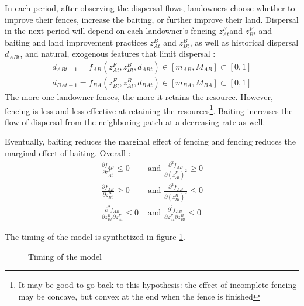 \documentclass{article}
\begin{document}
In each period, after observing the dispersal flows, landowners choose whether to improve their fences, increase the baiting, or further improve their land. 
Dispersal in the next period will depend on each landowner's fencing $z_{At}^F$and $z_{Bt}^F$ and baiting and land improvement practices $z_{At}^B$ and $z_{Bt}^B$, as well as historical dispersal $d_{ABt}$, and natural, exogenous features that limit dispersal : 
\begin{align}
    d_{ABt+1} = f_{AB}(z^F_{At}, z^B_{Bt}, d_{ABt}) \in [m_{AB},M_{AB}] \subset [0,1] \\
    d_{BAt+1} = f_{BA}(z^F_{Bt}, z^B_{At}, d_{BAt}) \in [m_{BA},M_{BA}] \subset [0,1]
\end{align}
The more one landowner fences, the more it retains the resource. However, fencing is less and less effective at retaining the resources\footnote{It may be good to go back to this hypothesis: the effect of incomplete fencing may be concave, but convex at the end when the fence is finished}. Baiting increases the flow of dispersal from the neighboring patch at a decreasing rate as well. 

Eventually, baiting reduces the marginal effect of fencing and fencing reduces the marginal effect of baiting. Overall : 
\begin{align*}
    \frac{\partial f_{AB}}{\partial z^F_{At}}\leq 0 &\text{ and } \frac{\partial^2 f_{AB}}{\partial (z^F_{At})^2} \geq 0\\
    \frac{\partial f_{AB}}{\partial z^B_{Bt}}\geq 0 &\text{ and } \frac{\partial^2 f_{AB}}{\partial (z^B_{Bt})^2} \leq 0\\
    \frac{\partial ^2 f_{AB}}{\partial z_{Bt}^B\partial z_{At}^F} \leq 0 &\text{ and } \frac{\partial ^2 f_{AB}}{\partial z_{At}^F\partial z_{Bt}^B} \leq 0
\end{align*}

The timing of the model is synthetized in figure \ref{fig:timing}.

\begin{figure}[H]
  \centering
  \caption{Timing of the model}
  \label{fig:timing}
\end{figure}
\end{document}
